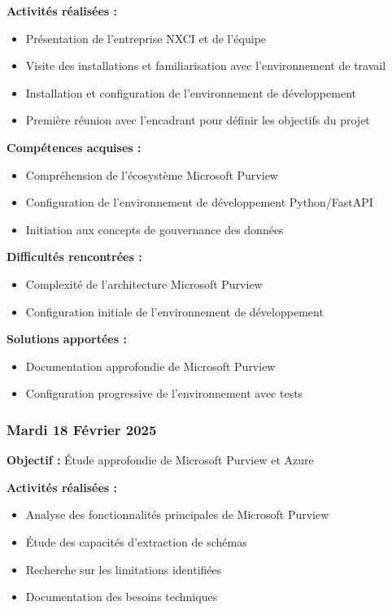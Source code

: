 \documentclass[12pt,a4paper]{article}
\begin{document}
\textbf{Activités réalisées :}
\begin{itemize}
    \item Présentation de l'entreprise NXCI et de l'équipe
    \item Visite des installations et familiarisation avec l'environnement de travail
    \item Installation et configuration de l'environnement de développement
    \item Première réunion avec l'encadrant pour définir les objectifs du projet
\end{itemize}

\textbf{Compétences acquises :}
\begin{itemize}
    \item Compréhension de l'écosystème Microsoft Purview
    \item Configuration de l'environnement de développement Python/FastAPI
    \item Initiation aux concepts de gouvernance des données
\end{itemize}

\textbf{Difficultés rencontrées :}
\begin{itemize}
    \item Complexité de l'architecture Microsoft Purview
    \item Configuration initiale de l'environnement de développement
\end{itemize}

\textbf{Solutions apportées :}
\begin{itemize}
    \item Documentation approfondie de Microsoft Purview
    \item Configuration progressive de l'environnement avec tests
\end{itemize}

\subsubsection{Mardi 18 Février 2025}
\textbf{Objectif :} Étude approfondie de Microsoft Purview et Azure

\textbf{Activités réalisées :}
\begin{itemize}
    \item Analyse des fonctionnalités principales de Microsoft Purview
    \item Étude des capacités d'extraction de schémas
    \item Recherche sur les limitations identifiées
    \item Documentation des besoins techniques
\end{itemize}
\end{document}
